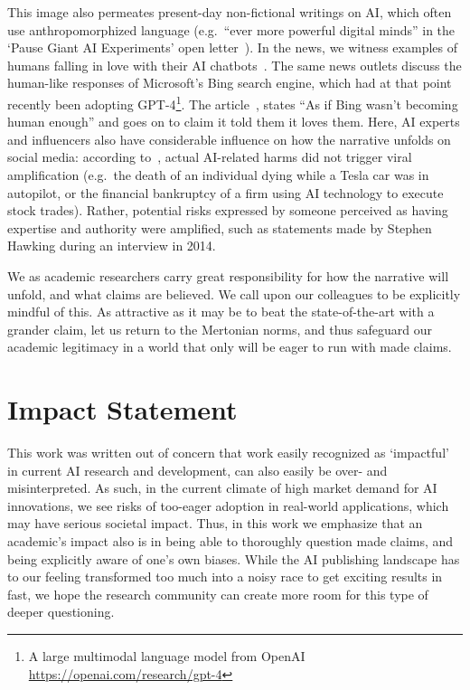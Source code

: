 This image also permeates present-day non-fictional writings on AI, which often use anthropomorphized language (e.g.\ ``ever more powerful digital minds'' in the `Pause Giant AI Experiments' open letter~\citep{pauseai}). In the news, we witness examples of humans falling in love with their AI chatbots~\citep{replika,nytimesailove}. The same news outlets discuss the human-like responses of Microsoft's Bing search engine, which had at that point recently been adopting GPT-4\footnote{A large multimodal language model from OpenAI \url{https://openai.com/research/gpt-4}}. The article~\citep{nytimesbing}, states ``As if Bing wasn’t becoming human enough'' and goes on to claim it told them it loves them. Here, AI experts and influencers also have considerable influence on how the narrative unfolds on social media: according to~\citet{neri2020role}, actual AI-related harms did not trigger viral amplification (e.g.\ the death of an individual dying while a Tesla car was in autopilot, or the financial bankruptcy of a firm using AI technology to execute stock trades). Rather, potential risks expressed by someone perceived as having expertise and authority were amplified, such as statements made by Stephen Hawking during an interview in 2014.

We as academic researchers carry great responsibility for how the narrative will unfold, and what claims are believed. We call upon our colleagues to be explicitly mindful of this. As attractive as it may be to beat the state-of-the-art with a grander claim, let us return to the Mertonian norms, and thus safeguard our academic legitimacy in a world that only will be eager to run with made claims.

\section*{Impact Statement}
This work was written out of concern that work easily recognized as `impactful' in current AI research and development, can also easily be over- and misinterpreted. As such, in the current climate of high market demand for AI innovations, we see risks of too-eager adoption in real-world applications, which may have serious societal impact. Thus, in this work we emphasize that an academic's impact also is in being able to thoroughly question made claims, and being explicitly aware of one's own biases. While the AI publishing landscape has to our feeling transformed too much into a noisy race to get exciting results in fast, we hope the research community can create more room for this type of deeper questioning.